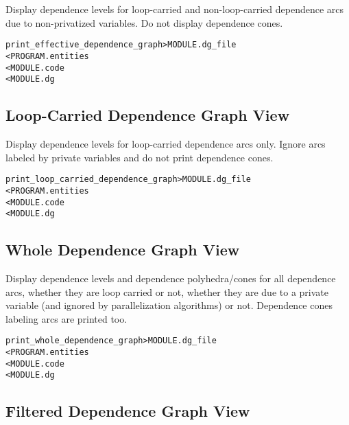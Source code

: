 \documentclass[a4paper]{report}
\newenvironment{PipsMake}{\begin{alltt}}{\end{alltt}}
\newenvironment{PipsPass}[1]{\label{pass:#1}}{}
\begin{document}
\begin{PipsPass}{print_effective_dependence_graph}
Display dependence levels for loop-carried and non-loop-carried dependence
arcs due to non-privatized variables. Do not display dependence cones.
\end{PipsPass}

\begin{PipsMake}
print_effective_dependence_graph          > MODULE.dg_file
        < PROGRAM.entities
        < MODULE.code
        < MODULE.dg
\end{PipsMake}

\subsection{Loop-Carried Dependence Graph View}

\begin{PipsPass}{print_loop_carried_dependence_graph}
Display dependence levels for loop-carried dependence arcs only. Ignore
arcs labeled by private variables and do not print dependence cones.
\end{PipsPass}

\begin{PipsMake}
print_loop_carried_dependence_graph          > MODULE.dg_file
        < PROGRAM.entities
        < MODULE.code
        < MODULE.dg
\end{PipsMake}

\subsection{Whole Dependence Graph View}

\begin{PipsPass}{print_whole_dependence_graph}
Display dependence levels and dependence polyhedra/cones for all
dependence arcs, whether they are loop carried or not, whether they are
due to a private variable (and ignored by parallelization algorithms) or
not. Dependence cones labeling arcs are printed too.
\end{PipsPass}

\begin{PipsMake}
print_whole_dependence_graph          > MODULE.dg_file
        < PROGRAM.entities
        < MODULE.code
        < MODULE.dg
\end{PipsMake}

\subsection{Filtered Dependence Graph View}
\end{document}
